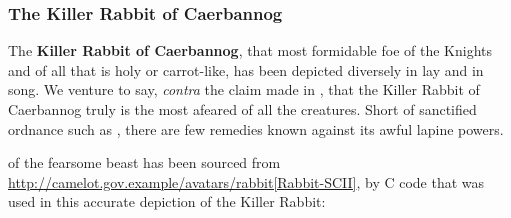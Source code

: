 \documentclass{metanorma}
\begin{document}
\subsubsection{The Killer Rabbit of Caerbannog}
\label{killer_rabbit_caerbannog}



The \textbf{Killer Rabbit of Caerbannog}, that most formidable foe of
the Knights and of all that is holy or carrot-like, has been
depicted diversely in lay and in song. We venture to say,
\textit{contra} the claim made in ,
that the Killer Rabbit of Caerbannog truly is the most afeared
of all the creatures. Short of sanctified ordnance such as
, there are few remedies
known against its awful lapine powers.



 of the fearsome beast
has been sourced from
\url{http://camelot.gov.example/avatars/rabbit[Rabbit-SCII]},
by C code that was used in this accurate depiction of the
Killer Rabbit:


\end{document}
